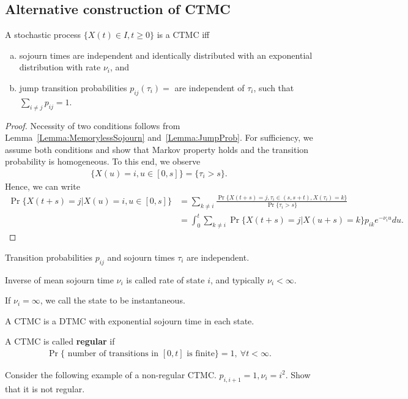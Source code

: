 \documentclass[a4paper,10pt,english]{article}
\begin{document}
\subsection{Alternative construction of CTMC}
\begin{prop} A stochastic process $\{X(t) \in I, t \geqslant 0 \}$ is a CTMC iff 
\begin{enumerate}[a.]
\item sojourn times are independent and identically distributed with an exponential distribution with rate $\nu_i$, and 
\item jump transition probabilities $p_{ij}(\tau_i) = $ are independent of $\tau_i$, such that $\sum_{i \neq j}p_{ij}=1$.
\end{enumerate}
\end{prop}
\begin{proof}
Necessity of two conditions follows from Lemma~\ref{Lemma:MemorylessSojourn} and~\ref{Lemma:JumpProb}. 
For sufficiency, we assume both conditions and show that Markov property holds and the transition probability is homogeneous. 
To this end, we observe
\begin{align*}
\{ X(u) = i, u \in [0,s] \} = \{ \tau_i > s \}.
\end{align*}
Hence, we can write
\begin{align*}
\Pr\{ X(t+s) = j | X(u) = i, u \in [0,s] \} 
&= %
\sum_{k \neq i}\frac{\Pr\{ X(t+s) = j, \tau_i \in (s,s+t), X(\tau_i) = k \}}{\Pr\{\tau_i > s\}}\\
&= \int_0^{t}\sum_{k \neq i}\Pr\{ X(t+s) = j| X(u+s) = k\} p_{ik} e^{-\nu_iu}du.
\end{align*}
\end{proof}
\begin{rem}
Transition probabilities $p_{ij}$ and sojourn times $\tau_i$ are independent. 
\end{rem}
\begin{rem} Inverse of mean sojourn time $\nu_i$ is called rate of state $i$, and typically $\nu_i < \infty$.  
\end{rem}
\begin{rem} If $\nu_i = \infty$, we call the state to be instantaneous. 
\end{rem}
\begin{rem}  A CTMC is a DTMC with exponential sojourn time in each state.
\end{rem}
\begin{defn} A CTMC is called \textbf{regular} if 
\begin{align*}
\Pr\{ \text{ number of transitions in } [0,t] \text{ is finite}\} = 1,~ \forall t < \infty.
\end{align*} 
\end{defn}
\begin{exmp} Consider the following example of a non-regular CTMC. $p_{i,i+1}=1, \nu_i = i^2$. Show that it is not regular.
\end{exmp}
\end{document}
